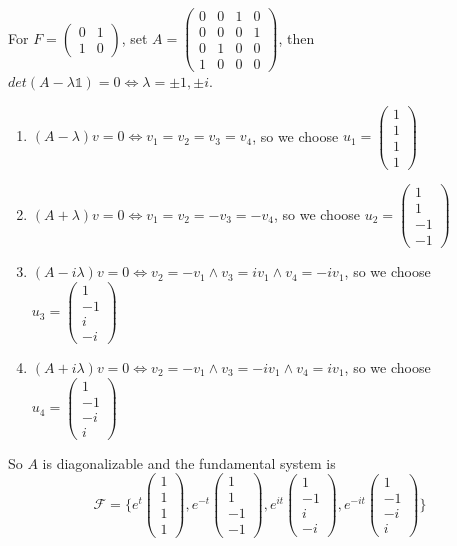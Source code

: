 \documentclass[a4paper,12pt,titlepage]{article}
\begin{document}
For $F=\begin{pmatrix}
0&1\\
1&0
\end{pmatrix}$, set $A=\begin{pmatrix}
0&0&1&0\\
0&0&0&1\\
0&1&0&0\\
1&0&0&0
\end{pmatrix}$, then
$det(A-\lambda\mathds{1})=0\Leftrightarrow\lambda=\pm1,\pm i$.
\begin{enumerate}
\item $(A-\lambda)v=0\Leftrightarrow v_1=v_2=v_3=v_4$, so we choose $u_1=\begin{pmatrix}
1\\
1\\
1\\
1
\end{pmatrix}$
\item $(A+\lambda)v=0\Leftrightarrow v_1=v_2=-v_3=-v_4$, so we choose $u_2=\begin{pmatrix}
1\\
1\\
-1\\
-1
\end{pmatrix}$
\item $(A-i\lambda)v=0\Leftrightarrow v_2=-v_1\wedge v_3=iv_1\wedge v_4=-iv_1$, so we choose $u_3=\begin{pmatrix}
1\\
-1\\
i\\
-i
\end{pmatrix}$
\item $(A+i\lambda)v=0\Leftrightarrow v_2=-v_1\wedge v_3=-iv_1\wedge v_4=iv_1$, so we choose $u_4=\begin{pmatrix}
1\\
-1\\
-i\\
i
\end{pmatrix}$

\end{enumerate}
So $A$ is diagonalizable and the fundamental system is
$$\mathscr{F}=\lbrace e^t\begin{pmatrix}
1\\
1\\
1\\
1
\end{pmatrix},e^{-t}\begin{pmatrix}
1\\
1\\
-1\\
-1
\end{pmatrix},e^{it}\begin{pmatrix}
1\\
-1\\
i\\
-i
\end{pmatrix},e^{-it}\begin{pmatrix}
1\\
-1\\
-i\\
i
\end{pmatrix}\rbrace$$
\end{document}
